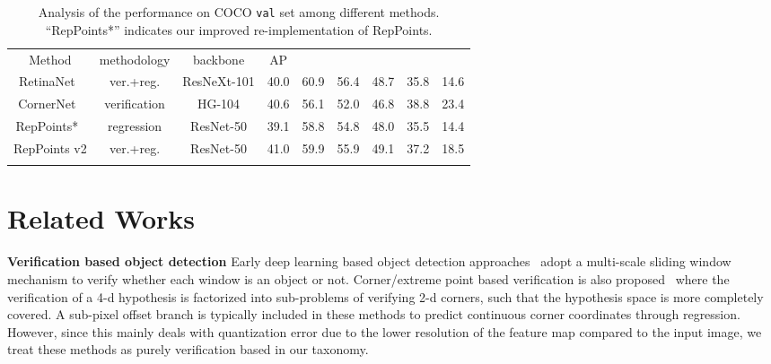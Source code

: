 \documentclass{article}
\begin{document}
\begin{table}[ht]
  \caption{Analysis of the performance on COCO \texttt{val} set among different methods. ``RepPoints*'' indicates our improved re-implementation of RepPoints.}
  \small
  \label{tab:compare}
  \centering
  \begin{tabular}{c|c|c|cccccc}
    \Xhline{1.0pt}
    Method & methodology & backbone & AP &  &  &  &  &  \\
    \Xhline{1.0pt}
    RetinaNet~\cite{RetinaNet} & ver.+reg. & ResNeXt-101 & 40.0 & 60.9 & 56.4 & 48.7 & 35.8 & 14.6\\
    \hline
    CornerNet~\cite{CornerNet} & verification & HG-104 & 40.6 & 56.1 & 52.0 & 46.8 & 38.8 & 23.4 \\
    \hline
    RepPoints*~\cite{yang19reppts} & regression & ResNet-50 & 39.1 & 58.8 & 54.8 & 48.0 & 35.5 & 14.4 \\    
    \Xhline{1.0pt}
    RepPoints v2 & ver.+reg. & ResNet-50 & 41.0 & 59.9 & 55.9 & 49.1 & 37.2 & 18.5 \\
    \Xhline{1.0pt}
  \end{tabular}
\end{table}


\section{Related Works}
\textbf{Verification based object detection}
Early deep learning based object detection approaches~\cite{szegedy2013deep,sermanet2014overfeat} adopt a multi-scale sliding window mechanism to  verify whether each window is an object or not. Corner/extreme point based verification is also proposed~\cite{Denet,CornerNet,ExtremeNet,duan19center} where the verification of a 4-d hypothesis is factorized into sub-problems of verifying 2-d corners, such that the hypothesis space is more completely covered. A sub-pixel offset branch is typically included in these methods to predict continuous corner coordinates through regression. However, since this mainly deals with quantization error due to the lower resolution of the feature map compared to the input image, we treat these methods as purely verification based in our taxonomy.
\end{document}

